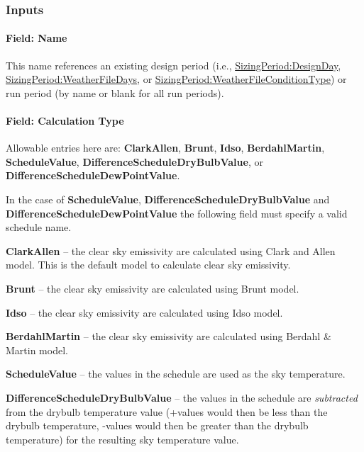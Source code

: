 \subsubsection{Inputs}\label{inputs-8-011}

\paragraph{Field: Name}\label{field-name-7-009}

This name references an existing design period (i.e., \hyperref[sizingperioddesignday]{SizingPeriod:DesignDay}, \hyperref[sizingperiodweatherfiledays]{SizingPeriod:WeatherFileDays}, or \hyperref[sizingperiodweatherfileconditiontype]{SizingPeriod:WeatherFileConditionType}) or run period (by name or blank for all run periods).

\paragraph{Field: Calculation Type}\label{field-calculation-type}

Allowable entries here are: \textbf{ClarkAllen}, \textbf{Brunt}, \textbf{Idso}, \textbf{BerdahlMartin}, \textbf{ScheduleValue}, \textbf{DifferenceScheduleDryBulbValue}, or \textbf{DifferenceScheduleDewPointValue}.

In the case of \textbf{ScheduleValue}, \textbf{DifferenceScheduleDryBulbValue} and \textbf{DifferenceScheduleDewPointValue} the following field must specify a valid schedule name.

\textbf{ClarkAllen} -- the clear sky emissivity are calculated using Clark and Allen model. This is the default model to calculate clear sky emissivity.

\textbf{Brunt} -- the clear sky emissivity are calculated using Brunt model.

\textbf{Idso} -- the clear sky emissivity are calculated using Idso model.

\textbf{BerdahlMartin} -- the clear sky emissivity are calculated using Berdahl \& Martin model.

\textbf{ScheduleValue} -- the values in the schedule are used as the sky temperature.

\textbf{DifferenceScheduleDryBulbValue} -- the values in the schedule are \emph{subtracted} from the drybulb temperature value (+values would then be less than the drybulb temperature, -values would then be greater than the drybulb temperature) for the resulting sky temperature value.

